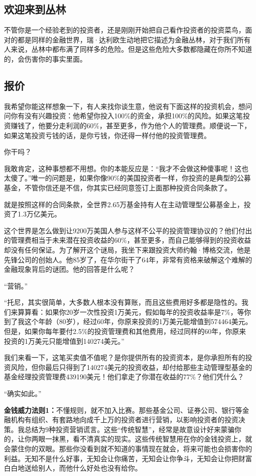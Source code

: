 \subsection{欢迎来到丛林}

不管你是一个经验老到的投资者，还是刚刚开始把自己看作投资者的投资菜鸟，面对的都是同样的金融世界，瑞·达利欧生动地把它描述为金融丛林，对于我们所有人来说，丛林中都布满了同样多的危险。但是这些危险大多数都隐藏在你所不知道的，会伤害你的事实里面。

\subsection{报价}

我希望你能这样想象一下，有人来找你谈生意，他说有下面这样的投资机会，想问问你有没有兴趣投资：他希望你投入100\%的资金，承担100\%的风险。如果这笔投资赚钱了，他要分走利润的60\%，甚至更多，作为他个人的管理费。顺便说一下，如果这笔投资亏钱的话，是你亏钱，你还得一样付他的投资管理费。

你干吗？

我敢肯定，这种事想都不用想。你的本能反应是：“我才不会做这种傻事呢！这也太傻了。”唯一的问题是，如果你像90\%的美国投资者一样，你投资的是典型的公募基金，不管你信还是不信，你其实已经同意签订上面那种投资合同条款了。

就是按照这样的合同条款，全世界2.65万基金持有人在主动管理型公募基金上，投资了1.3万亿美元。

这个世界是怎么做到让9200万美国人参与这样不公平的投资管理协议的？他们付出的管理费相当于未来潜在投资收益的60\%，甚至更多，而自己能够得到的投资收益却没有任何保证。为了解开这个谜局，我坐下来跟投资大师约翰·博格交流，他是先锋公司的创始人。他85岁了，在华尔街干了64年，非常有资格来破解这个难解的金融现象背后的谜团。他的回答是什么呢？

“营销。”

“托尼，其实很简单，大多数人根本没有算账，而且这些费用好多都是隐性的。我们来算算看：如果你20岁一次性投资1万美元，假如每年的投资收益率是7\%，等你到了我这个年龄（80岁），经过60年，你原来投资的1万美元能增值到574464美元。但是，如果你每年要付2.5\%的投资管理费和其他费用，经过同样的60年，你原来投资的1万美元只能增值到140274美元。”

我们来看一下，这笔买卖值不值呢？是你提供所有的投资资本，是你承担所有的投资风险，但你最后只得到了140274美元的投资收益，却付给那些主动管理型基金的基金经理投资管理费439190美元！他们拿走了你潜在收益的77\%？他们凭什么？

“确实如此。”

\textbf{金钱威力法则1：}不懂规则，就不加入比赛。那些基金公司、证券公司、银行等金融机构有组织、有套路地向成千上万的投资者进行营销，以影响投资者的投资决策。我总结为9种投资营销谎言。这些“传统智慧”，经常是故意设计好来蒙骗你的，让你两眼一抹黑，看不清真实的现实。这些传统智慧用在你的金钱投资上，就会蒙住你的双眼。那些你没看到就不知道的事情现在就会，将来可能也会损害你的利益。无知不是什么好事，无知会让你痛苦，无知会让你争斗，无知会让你把财富白白地送给别人，而他什么好处也没有给你。

